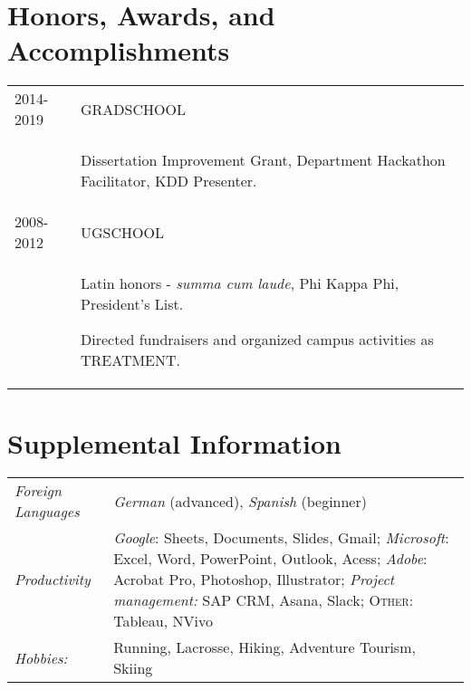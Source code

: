 \documentclass[a4paper,10pt]{article}
\begin{document}
\section{Honors, Awards, and Accomplishments}
\begin{supertabular}{p{3.4cm} p{13.9cm}}

	\textsc{2014-2019} 				& \textsc{GRADSCHOOL} \\
														& \begin{enumerate*}[label =$\circ$, itemjoin={\newline}]
																\item \footnotesize Dissertation Improvement Grant, Department Hackathon Facilitator, KDD Presenter.
																\end{enumerate*} \vspace{2mm} \\

	\textsc{2008-2012} 				& \textsc{UGSCHOOL} \\
														& \begin{enumerate*}[label =$\circ$, itemjoin={\newline}]
																\item \footnotesize  Latin honors - \emph{summa cum laude}, Phi Kappa Phi, President's List.
																\item \footnotesize  Directed fundraisers and organized campus activities as TREATMENT.
																\end{enumerate*} \vspace{0mm} \\



\end{supertabular}



\section{Supplemental Information}
\begin{supertabular}{p{3.4cm} p{13.9cm}}
	\emph{Foreign Languages}			& \small \emph{German} (advanced), \emph{Spanish} (beginner) \vspace{1mm} \\

	\emph{Productivity}					& \small\emph{Google}: \footnotesize Sheets, Documents, Slides, Gmail; \small\emph{Microsoft}: \footnotesize Excel, Word, PowerPoint, Outlook, Acess;	\small\emph{Adobe}: \footnotesize Acrobat Pro, Photoshop, Illustrator; \small\emph{Project management:} \footnotesize SAP CRM, Asana, Slack; \small\textsc{Other:} \footnotesize Tableau, NVivo \vspace{1mm} \\
	\emph{Hobbies:} 		& \small Running, Lacrosse, Hiking, Adventure Tourism, Skiing \\

\end{supertabular}
\end{document}

